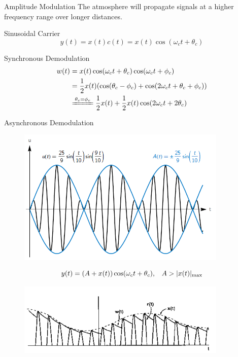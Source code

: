 \documentclass{beamer}
\begin{document}
\begin{frame}
\begin{block}{Amplitude Modulation}
The atmosphere will propagate signals at a higher frequency range over longer distances. 
\end{block}
\begin{block}{Sinusoidal Carrier}
$$y(t)=x(t)c(t)=x(t)\cos(\omega_ct+\theta_c)$$
\end{block}
\begin{block}{Synchronous Demodulation}
\begin{align*}
w(t)&=x(t)\cos(\omega_ct+\theta_c)\cos(\omega_ct+\phi_c)\\
&=\dfrac{1}{2}x(t)(\cos(\theta_c-\phi_c)+\cos(2\omega_ct+\theta_c+\phi_c))\\
&\xlongequal{\theta_c=\phi_c}\dfrac{1}{2}x(t)+\dfrac{1}{2}x(t)\cos(2\omega_ct+2\theta_c)
\end{align*}
\end{block}
\end{frame}

\begin{frame}
\begin{block}{Asynchronous Demodulation}
\begin{figure}[h]
    \centering
    \includegraphics[width=10cm]{AN0.png}
\end{figure}

\end{block}
\end{frame}

\begin{frame}

$$y(t)=(A+x(t))\cos(\omega_ct+\theta_c),\hspace{3mm} A>|x(t)|_{\max}$$
\begin{figure}[h]
    \centering
    \includegraphics[width=10cm]{AM.png}
\end{figure}
\end{frame}
\end{document}
